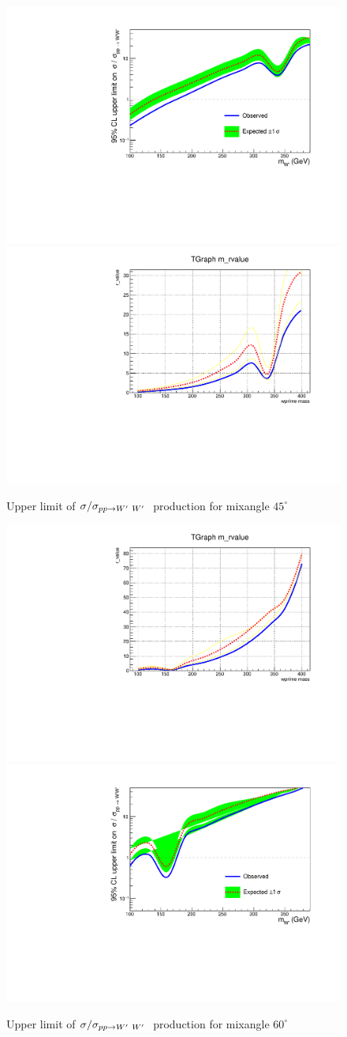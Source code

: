 \begin{figure}[!ht]
\centering
\includegraphics*[width=.45\textwidth]{figs/mix45b.pdf}
\hspace{3mm}
\includegraphics*[width=.45\textwidth]{figs/mix45.pdf}
\caption{Upper limit of $\sigma/\sigma_{pp \rightarrow W^\prime~ W^\prime~}$ production for mixangle $45^\circ$ }
\label{fig:mix45}
\end{figure}

\begin{figure}[!ht]
\centering
\includegraphics*[width=.45\textwidth]{figs/mix60b.pdf}
\hspace{3mm}
\includegraphics*[width=.45\textwidth]{figs/mix60.pdf}
\caption{Upper limit of $\sigma/\sigma_{pp \rightarrow W^\prime~ W^\prime~}$ production for mixangle $60^\circ$ }
\label{fig:mix60}
\end{figure}
 
